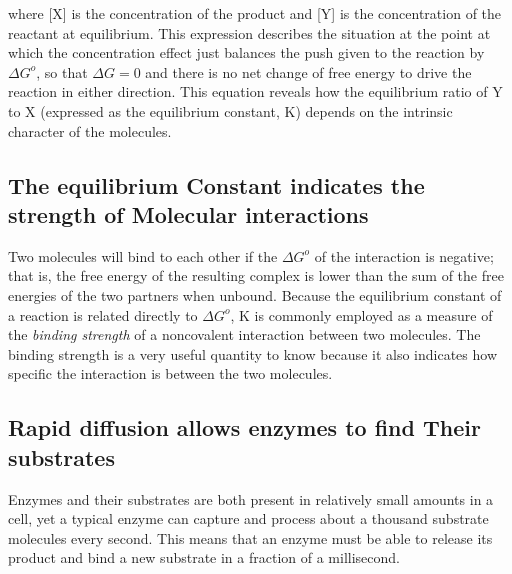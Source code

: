 where [X] is the concentration of the product and [Y] is the concentration
of the reactant at equilibrium. This expression describes the situation at
the point at which the concentration effect just balances the push given
to the reaction by $\Delta G^{o}$, so that $\Delta G = 0$ and there is no net change of free
energy to drive the reaction in either direction.
This equation reveals how the equilibrium ratio of Y to X (expressed as
the equilibrium constant, K) depends on the intrinsic character of the molecules.


\subsection{The equilibrium Constant indicates the strength of Molecular interactions}

Two molecules will bind to each other if the $\Delta G^{o}$ of the interaction is
negative; that is, the free energy of the resulting complex is lower than
the sum of the free energies of the two partners when unbound. Because
the equilibrium constant of a reaction is related directly to $\Delta G^{o}$, K is
commonly employed as a measure of the \textit{binding strength} of a noncovalent
interaction between two molecules. The binding strength is a very useful
quantity to know because it also indicates how specific the interaction is
between the two molecules.


\subsection{Rapid diffusion allows enzymes to find Their substrates}

Enzymes and their substrates are both present in relatively small amounts
in a cell, yet a typical enzyme can capture and process about a thousand
substrate molecules every second. This means that an enzyme must be
able to release its product and bind a new substrate in a fraction of a
millisecond.

